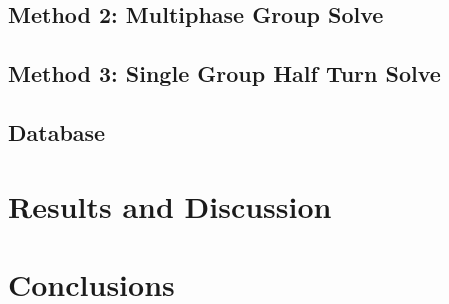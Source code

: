 \documentclass{report}
\begin{document}
    
    
	\section{Method 2: Multiphase Group Solve}
	\section{Method 3: Single Group Half Turn Solve}
	
    \section{Database}
    
    
    
    
    
    
    
    
    \newpage
    \chapter{Results and Discussion}
    
    \newpage
    \chapter{Conclusions}
    
    \newpage
    \begin{appendix}  
    	\listoffigures
    	\listoftables
    	\newpage
    	
    	
    \end{appendix}
    
\end{document}
